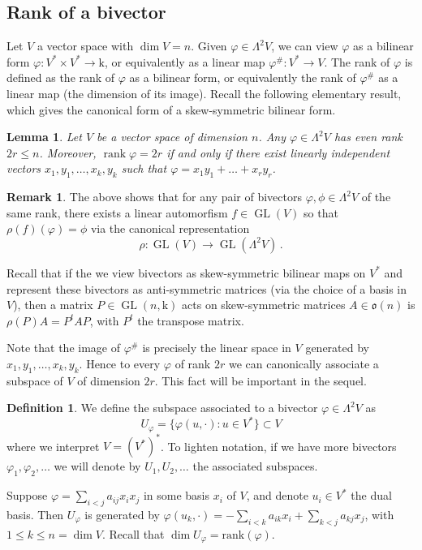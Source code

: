\documentclass[10pt,reqno]{amsart}
\newcommand{\GL}{\operatorname{GL}}
\DeclareMathOperator{\rank}{rank}
\newcommand{\f}{\varphi}
\newcommand{\p}{\phi}
\renewcommand{\L}{\Lambda}
\newcommand{\kk}{\mathrm{k}}
\newtheorem{lemma}[theorem]{Lemma}
\theoremstyle{definition}
\newtheorem{definition}[theorem]{Definition}
\newtheorem{remark}[theorem]{Remark}
\begin{document}
\subsection{Rank of a bivector}
Let $V$ a vector space with $\dim V=n$.
Given $\f \in \L^2 V$, we can view $\f$ as a bilinear form $\f: V^* \times V^* \to \kk$, or equivalently as a linear map $\f^\#: V^* \to V$. The rank of $\f$ is defined as the rank of $\f$ as a bilinear form, or equivalently the rank of $\f^\#$ as a linear map (the dimension of its image). Recall the following elementary result, which gives the canonical form of a skew-symmetric bilinear form.

\begin{lemma}
Let $V$ be a vector space of dimension $n$.
Any $\f \in \L^2 V$ has even rank $2r \le n$. Moreover, $\rank \f=2r$ if and only if there exist linearly independent vectors $x_1,y_1, \ldots , x_k, y_k$ such that $\f=x_1  y_1+ \dots + x_r  y_r$.
\end{lemma}
\begin{remark} \label{rem:action-GL(W)-on-bivectors}
The above shows that for any pair of bivectors $\f, \p \in \L^2 V$ of the same rank, there exists a linear automorfism $f \in \GL(V)$ so that $\rho(f) (\f)=\p$ via the canonical representation 
\[
\rho\colon \GL(V) \to \GL(\L^2 V) \, .
\] 
\end{remark}


\noindent Recall that if the we view bivectors as skew-symmetric bilinear maps on $V^*$ and represent these bivectors as anti-symmetric matrices (via the choice of a basis in $V$), then a matrix $P \in \GL(n,\kk)$ acts on skew-symmetric matrices $A \in \mathfrak{o}(n)$ is $\rho(P) A=P^t A P$, with $P^t$ the transpose matrix.

\noindent Note that the image of $\f^\#$ is precisely the linear space in $V$ generated by $x_1,y_1,\dots, x_k,y_k$. 
Hence to every $\f$ of rank $2r$ we can canonically associate a subspace of $V$ of dimension $2r$. This fact will be important in the sequel.
\begin{definition}
We define the subspace associated to a bivector $\f \in \L^2 V$ as
\[
U_{\f}= \{ \f(u, \cdot): u \in V^*\} \subset V
\]
where we interpret $V=(V^*)^*$. To lighten notation, if we have more bivectors $\f_1,\f_2,\ldots$ we will denote by $U_1,U_2,\ldots$ the associated subspaces.
\end{definition}

\noindent Suppose $\f=\sum_{i<j} a_{ij} x_i x_j$ in some basis $x_i$ of $V$, and denote $u_i \in V^*$ the dual basis. Then $U_{\f}$ is generated by $\f(u_k,\cdot)= -\sum_{i<k} a_{ik} x_i + \sum_{k<j} a_{kj} x_j$, with $1 \le k \le n=\dim V$.
Recall that $\dim U_{\f}= \mathrm{rank}(\f)$.
\end{document}
